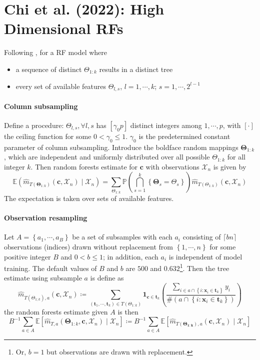\documentclass[twoside]{article}
\begin{document}
\section{Chi et al. (2022): High Dimensional RFs}
Following \citet{chi2022asymptotic}, for a RF model where
\begin{itemize}
    \item a sequence of distinct $\Theta_{1:k}$ results in a distinct tree
    \item every set of available features $\Theta_{l,s}$, $l=1,\cdots,k$; $s=1,\cdots,2^{l-1}$
\end{itemize}

\paragraph*{Column subsampling} Define a  procedure: $\Theta_{l,s},\forall l,s$ has $[\gamma_0p]$ distinct integers among $1,\cdots,p$, with $[\cdot]$ the ceiling function for some $0<\gamma_0\leq 1$. $\gamma_0$ is the predetermined constant parameter of column subsampling.
Introduce the boldface random mappings $\boldsymbol{\Theta}_{1:k}$, which are independent and uniformly distributed over all possible $\Theta_{1:k}$ for all integer $k$. Then random forests estimate for $\mathbf{c}$ with observations $\mathcal{X}_n$ is given by 
\begin{equation*}
    \mathbb{E}\left( \hat{m}_{T(\boldsymbol{\Theta}_{1:k})}\left(\mathbf{c},\mathcal{X}_n\right) \mid \mathcal{X}_n \right) = \sum_{\Theta_{1:k}} \mathbb{P} \left( \bigcap^k_{s=1} \left\{ \boldsymbol{\Theta}_s = \Theta_s \right\} \right) \hat{m}_{T(\Theta_{1:k})} \left(\mathbf{c},\mathcal{X}_n\right)
\end{equation*}
The expectation is taken over sets of available features.

\paragraph*{Observation resampling}
Let $A=\left\{a_1,\cdots, a_B\right\}$ be a set of subsamples with each $a_i$ consisting of $\lceil bn\rceil$ observations (indices) drawn without replacement from $\left\{1,\cdots,n\right\}$ for some positive integer $B$ and $0<b\leq 1$; in addition, each $a_i$ is independent of model training. The default values of $B$ and $b$ are $500$ and $0.632$\footnote{Or, $b=1$ but observations are drawn with replacement.}. Then the tree estimate using subsample $a$ is 
define as 
$$
\hat{m}_{T(\Theta_{1;k}),a}\left(\mathbf{c},\mathcal{X}_n\right) \coloneq \sum_{\left( \mathbf{t}_1,\cdots,\mathbf{t}_k \right)\in T(\Theta_{1:k})}\mathbf{1}_{\mathbf{c}\in\mathbf{t}_k}\left( \frac{\sum_{i\in a\cap \left\{i:\mathbf{x}_i\in\mathbf{t}_k\right\} }y_i}{\#\left(a\cap \left\{i:\mathbf{x}_i\in\mathbf{t}_k\right\}\right) } \right)
$$
the random forests estimate given $A$ is then 
$$
B^{-1}\sum_{a\in A}\mathbb{E}\left[\hat{m}_{T,a}\left(\boldsymbol{\Theta}_{1:k},\mathbf{c},\mathcal{X}_n \right) \mid \mathcal{X}_n\right] \coloneq B^{-1}\sum_{a\in A}\mathbb{E}\left[\hat{m}_{T(\boldsymbol{\Theta_{1:k}}),a}\left(\mathbf{c},\mathcal{X}_n\right)\mid \mathcal{X}_n\right]
$$
\end{document}
